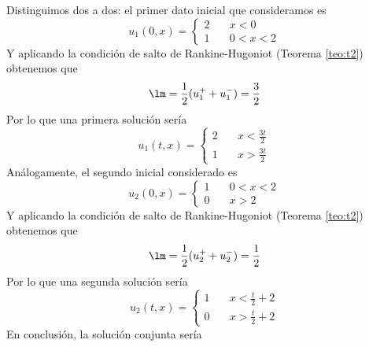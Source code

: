 \begin{ejercicio}
\begin{itemize}
\begin{figure}[H]
\begin{center}
            \end{center}
        \end{figure}
        Distinguimos dos a dos: el primer dato inicial que consideramos es 
        $$u_1(0,x) = \begin{cases}
            2 \quad& x < 0 \\
            1 \quad& 0 < x < 2
        \end{cases}$$
        Y aplicando la condición de salto de Rankine-Hugoniot (Teorema \ref{teo:t2}) obtenemos que 
        $$\lm = \dfrac{1}{2}(u_1^{+} + u_1^{-}) = \dfrac{3}{2}$$
        Por lo que una primera solución sería 
        $$u_1(t,x) = \begin{cases}
            2 \quad& x < \frac{3t}{2} \\
            1 \quad& x > \frac{3t}{2}
        \end{cases}$$
        Análogamente, el segundo inicial considerado es 
        $$u_2(0,x) = \begin{cases}
            1 \quad& 0 < x < 2 \\
            0 \quad& x > 2
        \end{cases}$$
        Y aplicando la condición de salto de Rankine-Hugoniot (Teorema \ref{teo:t2}) obtenemos que 
        $$\lm = \dfrac{1}{2}(u_2^{+} + u_2^{-}) = \dfrac{1}{2}$$
        Por lo que una segunda solución sería 
        $$u_2(t,x) = \begin{cases}
            1 \quad& x < \frac{t}{2} + 2 \\
            0 \quad& x > \frac{t}{2} + 2
        \end{cases}$$
        En conclusión, la solución conjunta sería 

\end{itemize}
\end{ejercicio}
